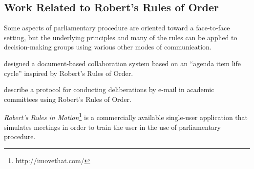 \documentclass{book}
\begin{document}


% 
% 

\subsection{Work Related to Robert's Rules of Order}

Some aspects of parliamentary procedure are oriented toward a face-to-face setting, but the underlying principles and many of the rules can be applied to decision-making groups using various other modes of communication.

\citealt{zhang:rule-mitigated} designed a document-based collaboration system based on an ``agenda item life cycle'' inspired by Robert's Rules of Order.


\citealt{horan:protocol} describe a protocol for conducting deliberations by e-mail in academic committees using Robert's Rules of Order. 

\emph{Robert's Rules in Motion}\footnote{http://imovethat.com/} is a commercially available single-user application that simulates meetings in order to train the user in the use of parliamentary procedure.


% 
\end{document}
